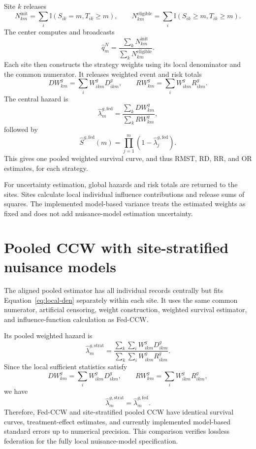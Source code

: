\documentclass[11pt]{article}
\newcommand{\ind}{\mathbb{I}}
\begin{document}
Site $k$ releases
\[
  N^{\mathrm{init}}_{km}
  =\sum_i\ind(S_{ik}=m,T_{ik}\geq m),
  \qquad
  N^{\mathrm{eligible}}_{km}
  =\sum_i\ind(S_{ik}\geq m,T_{ik}\geq m).
\]
The center computes and broadcasts
\begin{equation}
\label{eq:fed-num}
  \widehat q_m^N
  =\frac{\sum_kN^{\mathrm{init}}_{km}}
         {\sum_kN^{\mathrm{eligible}}_{km}}.
\end{equation}
Each site then constructs the strategy weights using its local denominator and
the common numerator. It releases weighted event and risk totals
\[
  DW^g_{km}=\sum_iW^g_{ikm}D^g_{ikm},
  \qquad
  RW^g_{km}=\sum_iW^g_{ikm}R^g_{ikm}.
\]
The central hazard is
\begin{equation}
\label{eq:fed-hazard}
  \widehat\lambda_m^{g,\mathrm{fed}}
  =\frac{\sum_kDW^g_{km}}{\sum_kRW^g_{km}},
\end{equation}
followed by
\[
  \widehat S^{g,\mathrm{fed}}(m)
  =\prod_{j=1}^m(1-\widehat\lambda_j^{g,\mathrm{fed}}).
\]
This gives one pooled weighted survival curve, and thus RMST, RD, RR, and OR estimates, for each strategy. 

For uncertainty estimation, global hazards and risk totals are returned to
the sites. Sites calculate local individual influence contributions and
release sums of squares. The implemented model-based variance treats the
estimated weights as fixed and does not add nuisance-model estimation
uncertainty.

\section{Pooled CCW with site-stratified nuisance models}

The aligned pooled estimator has all individual records centrally but fits
Equation~\eqref{eq:local-den} separately within each site. It uses the same
common numerator, artificial censoring, weight construction, weighted survival
estimator, and influence-function calculation as Fed-CCW.

Its pooled weighted hazard is
\[
  \widehat\lambda_m^{g,\mathrm{strat}}
  =\frac{\sum_k\sum_iW^g_{ikm}D^g_{ikm}}
         {\sum_k\sum_iW^g_{ikm}R^g_{ikm}}.
\]
Since the local sufficient statistics satisfy
\[
  DW^g_{km}=\sum_iW^g_{ikm}D^g_{ikm},
  \qquad
  RW^g_{km}=\sum_iW^g_{ikm}R^g_{ikm},
\]
we have
\[
  \widehat\lambda_m^{g,\mathrm{strat}}
  =\widehat\lambda_m^{g,\mathrm{fed}}.
\]
Therefore, Fed-CCW and site-stratified pooled CCW have identical survival
curves, treatment-effect estimates, and currently implemented model-based
standard errors up to numerical precision. This comparison verifies lossless
federation for the fully local nuisance-model specification.
\end{document}
